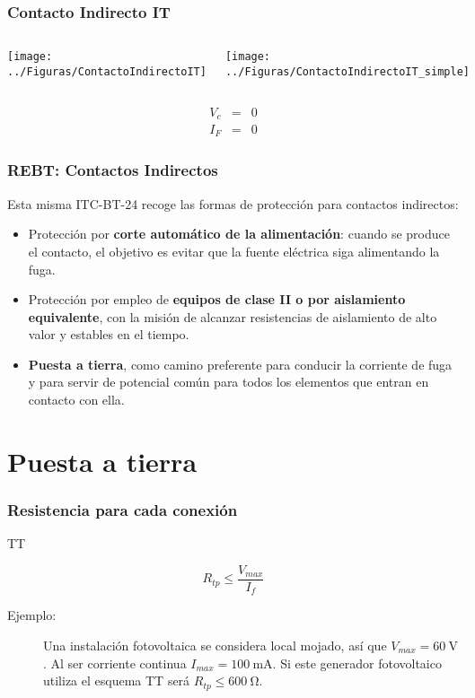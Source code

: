 \documentclass[serif, xcolor=dvipsnames]{beamer}
\begin{document}
\begin{frame}
\frametitle{Contacto Indirecto IT}
\begin{columns}[t]%


\column{6cm}

\texttt{[image: ../Figuras/ContactoIndirectoIT]}


\column{4cm}

\texttt{[image: ../Figuras/ContactoIndirectoIT\_simple]}

\end{columns}%
\begin{eqnarray*}
V_{c} & = & 0\\
I_{F} & = & 0\end{eqnarray*}



\end{frame}

\begin{frame}
\frametitle{REBT: Contactos Indirectos}

Esta misma ITC-BT-24 recoge las formas de protección para contactos
indirectos:
\begin{itemize}
\item Protección por \textbf{corte automático de la alimentación}: cuando
se produce el contacto, el objetivo es evitar que la fuente eléctrica
siga alimentando la fuga.
\item Protección por empleo de \textbf{equipos de clase II o por aislamiento
equivalente}, con la misión de alcanzar resistencias de aislamiento
de alto valor y estables en el tiempo.
\item \textbf{Puesta a tierra}, como camino preferente para conducir la
corriente de fuga y para servir de potencial común para todos los
elementos que entran en contacto con ella.
\end{itemize}

\end{frame}

\section{Puesta a tierra}


\begin{frame}
\frametitle{Resistencia para cada conexión}
\begin{block}
{TT}

\[
R_{tp}\leq\frac{V_{max}}{I_{f}}\]

\begin{description}
\item [{Ejemplo:}] Una instalación fotovoltaica se considera local mojado,
así que $V_{max}=\SI{60}{\volt}$. Al ser corriente continua $I_{max}=\SI{100}{\milli\ampere}$.
Si este generador fotovoltaico utiliza el esquema TT será $R_{tp}\leq\SI{600}{\ohm}$.
\end{description}
\end{block}

\end{frame}
\end{document}
